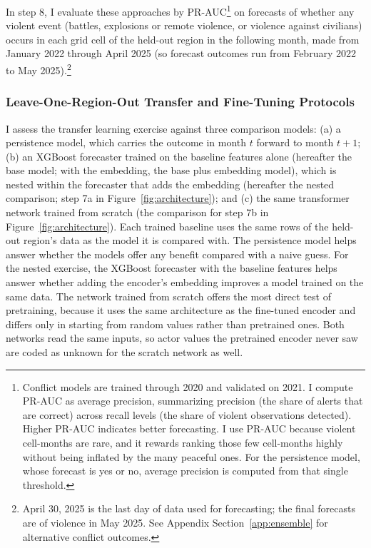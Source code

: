 \documentclass[11pt, letterpaper]{article}
\begin{document}
In step 8, I evaluate these approaches by PR-AUC\footnote{Conflict models are trained through 2020 and validated on 2021. I compute PR-AUC as average precision, summarizing precision (the share of alerts that are correct) across recall levels (the share of violent observations detected). Higher PR-AUC indicates better forecasting. I use PR-AUC because violent cell-months are rare, and it rewards ranking those few cell-months highly without being inflated by the many peaceful ones. For the persistence model, whose forecast is yes or no, average precision is computed from that single threshold.} on forecasts of whether any violent event (battles, explosions or remote violence, or violence against civilians) occurs in each grid cell of the held-out region in the following month, made from January 2022 through April 2025 (so forecast outcomes run from February 2022 to May 2025).\footnote{April 30, 2025 is the last day of data used for forecasting; the final forecasts are of violence in May 2025. See Appendix Section~\ref{app:ensemble} for alternative conflict outcomes.}

\subsubsection{Leave-One-Region-Out Transfer and Fine-Tuning Protocols}
I assess the transfer learning exercise against three comparison models: (a) a persistence model, which carries the outcome in month $t$ forward to month $t+1$; (b) an XGBoost forecaster trained on the baseline features alone (hereafter the base model; with the embedding, the base plus embedding model), which is nested within the forecaster that adds the embedding (hereafter the nested comparison; step 7a in Figure~\ref{fig:architecture}); and (c) the same transformer network trained from scratch (the comparison for step 7b in Figure~\ref{fig:architecture}). Each trained baseline uses the same rows of the held-out region's data as the model it is compared with. The persistence model helps answer whether the models offer any benefit compared with a naive guess. %
For the nested exercise, the XGBoost forecaster with the baseline features helps answer whether adding the encoder's embedding improves a model trained on the same data. The network trained from scratch offers the most direct test of pretraining, because it uses the same architecture as the fine-tuned encoder and differs only in starting from random values rather than pretrained ones. Both networks read the same inputs, so actor values the pretrained encoder never saw are coded as unknown for the scratch network as well. 
\end{document}
